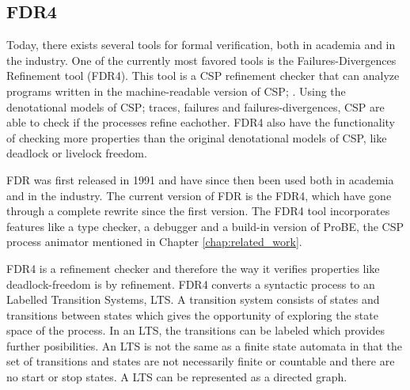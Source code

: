 \subsection{FDR4}
Today, there exists several tools for formal verification, both in academia and in the industry. One of the currently most favored tools is the Failures-Divergences Refinement tool (FDR4). This tool is a CSP refinement checker that can analyze programs written in the machine-readable version of CSP; \cspm{}.
Using the denotational models of CSP; traces, failures and failures-divergences, CSP are able to check if the processes refine eachother. FDR4 also have the functionality of checking more properties than the original denotational models of CSP, like deadlock or livelock freedom.

FDR was first released in 1991 and have since then been used both in academia and in the industry. The current version of FDR is the FDR4, which have gone through a complete rewrite since the first version.
The FDR4 tool incorporates features like a \cspm type checker, a debugger and a build-in version of ProBE, the CSP process animator mentioned in Chapter \ref{chap:related_work}.

FDR4 is a refinement checker and therefore the way it verifies properties like deadlock-freedom is by refinement. FDR4 converts a syntactic process to an Labelled Transition Systems, LTS. A transition system consists of states and transitions between states which gives the opportunity of exploring the state space of the process. In an LTS, the transitions can be labeled which provides further posibilities. An LTS is not the same as a finite state automata in that the set of transitions and states are not necessarily finite or countable and there are no start or stop states. A LTS can be represented as a directed graph.

